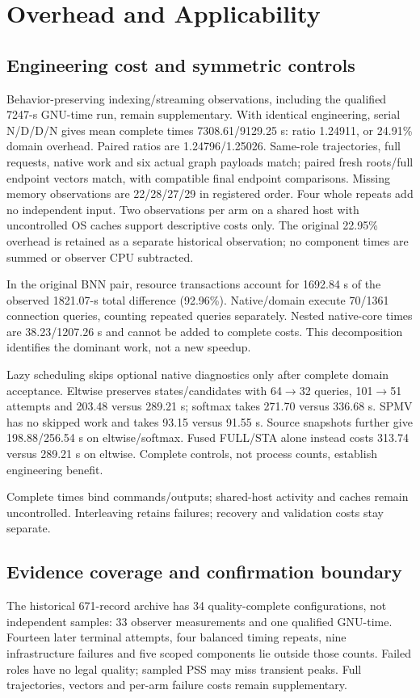 \documentclass[conference,10pt]{IEEEtran}
\begin{document}
\section{Overhead and Applicability}
\subsection{Engineering cost and symmetric controls}
Behavior-preserving indexing/streaming observations, including the qualified 7247-s GNU-time run, remain supplementary. With identical engineering, serial N/D/D/N gives mean complete times 7308.61/9129.25 s: ratio 1.24911, or 24.91\% domain overhead. Paired ratios are 1.24796/1.25026. Same-role trajectories, full requests, native work and six actual graph payloads match; paired fresh roots/full endpoint vectors match, with compatible final endpoint comparisons. Missing memory observations are 22/28/27/29 in registered order. Four whole repeats add no independent input. Two observations per arm on a shared host with uncontrolled OS caches support descriptive costs only. The original 22.95\% overhead is retained as a separate historical observation; no component times are summed or observer CPU subtracted.

In the original BNN pair, resource transactions account for 1692.84 s of the observed 1821.07-s total difference (92.96\%). Native/domain execute 70/1361 connection queries, counting repeated queries separately. Nested native-core times are 38.23/1207.26 s and cannot be added to complete costs. This decomposition identifies the dominant work, not a new speedup.

Lazy scheduling skips optional native diagnostics only after complete domain acceptance. Eltwise preserves states/candidates with 64$\to$32 queries, 101$\to$51 attempts and 203.48 versus 289.21 s; softmax takes 271.70 versus 336.68 s. SPMV has no skipped work and takes 93.15 versus 91.55 s. Source snapshots further give 198.88/256.54 s on eltwise/softmax. Fused FULL/STA alone instead costs 313.74 versus 289.21 s on eltwise. Complete controls, not process counts, establish engineering benefit.



Complete times bind commands/outputs; shared-host activity and caches remain uncontrolled. Interleaving retains failures; recovery and validation costs stay separate.

\subsection{Evidence coverage and confirmation boundary}
The historical 671-record archive has 34 quality-complete configurations, not independent samples: 33 observer measurements and one qualified GNU-time. Fourteen later terminal attempts, four balanced timing repeats, nine infrastructure failures and five scoped components lie outside those counts. Failed roles have no legal quality; sampled PSS may miss transient peaks. Full trajectories, vectors and per-arm failure costs remain supplementary.
\end{document}
